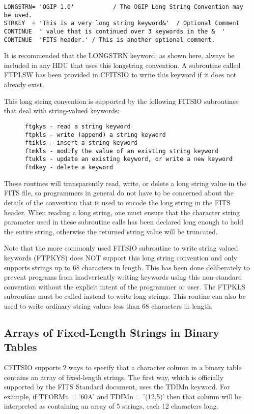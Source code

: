 \documentclass[11pt]{book}
\begin{document}
\begin{verbatim}
LONGSTRN= 'OGIP 1.0'           / The OGIP Long String Convention may be used.
STRKEY  = 'This is a very long string keyword&'  / Optional Comment
CONTINUE  ' value that is continued over 3 keywords in the &  '
CONTINUE  'FITS header.' / This is another optional comment.
\end{verbatim}
It is recommended that the LONGSTRN keyword, as shown
here, always be included in any HDU that uses this longstring
convention.  A subroutine called FTPLSW
has been provided in CFITSIO to write this keyword if it does not
already exist.

This long string convention is supported by the following FITSIO
subroutines that deal with string-valued keywords:

\begin{verbatim}
      ftgkys - read a string keyword
      ftpkls - write (append) a string keyword
      ftikls - insert a string keyword
      ftmkls - modify the value of an existing string keyword
      ftukls - update an existing keyword, or write a new keyword
      ftdkey - delete a keyword
\end{verbatim}
These routines will transparently read, write, or delete a long string
value in the FITS file, so programmers in general do not have to be
concerned about the details of the convention that is used to encode
the long string in the FITS header.  When reading a long string, one
must ensure that the character string parameter used in these
subroutine calls has been declared long enough to hold the entire
string, otherwise the returned string value will be truncated.

Note that the more commonly used FITSIO subroutine to write string
valued keywords (FTPKYS) does NOT support this long string convention
and only supports strings up to 68 characters in length.  This has been
done deliberately to prevent programs from inadvertently writing
keywords using this non-standard convention without the explicit intent
of the programmer or user.   The FTPKLS subroutine must be called
instead to write long strings.  This routine can also be used to write
ordinary string values less than 68 characters in length.


\subsection{Arrays of Fixed-Length Strings in Binary Tables}

CFITSIO supports 2 ways to specify that a character column in a binary
table contains an array of fixed-length strings.  The first way, which
is officially supported by the FITS Standard document, uses the TDIMn keyword.
For example, if TFORMn = '60A' and TDIMn = '(12,5)' then that
column will be interpreted as containing an array of 5 strings, each 12
characters long.
\end{document}
